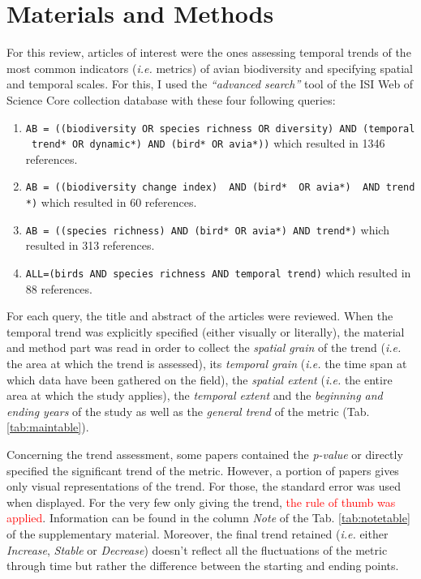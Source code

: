 \documentclass[
  12pt,
  oneside]{report}
\begin{document}
\hypertarget{materials-and-methods}{%
\chapter{Materials and Methods}\label{materials-and-methods}}

For this review, articles of interest were the ones assessing temporal trends of the most common indicators (\emph{i.e.} metrics) of avian biodiversity and specifying spatial and temporal scales. For this, I used the \emph{``advanced search''} tool of the ISI Web of Science Core collection database with these four following queries:

\begin{enumerate}
\def\labelenumi{\arabic{enumi}.}
\item
  \texttt{AB\ =\ ((biodiversity\ OR\ species\ richness\ OR\ diversity)\ AND\ (temporal\ trend*\ OR\ dynamic*)\ AND\ (bird*\ OR\ avia*))} which resulted in 1346 references.
\item
  \texttt{AB\ =\ ((biodiversity\ change\ index)\ \ AND\ (bird*\ \ OR\ avia*)\ \ AND\ trend*)} which resulted in 60 references.
\item
  \texttt{AB\ =\ ((species\ richness)\ AND\ (bird*\ OR\ avia*)\ AND\ trend*)} which resulted in 313 references.
\item
  \texttt{ALL=(birds\ AND\ species\ richness\ AND\ temporal\ trend)} which resulted in 88 references.
\end{enumerate}

For each query, the title and abstract of the articles were reviewed. When the temporal trend was explicitly specified (either visually or literally), the material and method part was read in order to collect the \emph{spatial grain} of the trend (\emph{i.e.} the area at which the trend is assessed), its \emph{temporal grain} (\emph{i.e.} the time span at which data have been gathered on the field), the \emph{spatial extent} (\emph{i.e.} the entire area at which the study applies), the \emph{temporal extent} and the \emph{beginning and ending years} of the study as well as the \emph{general trend} of the metric (Tab. \ref{tab:maintable}).

Concerning the trend assessment, some papers contained the \emph{p-value} or directly specified the significant trend of the metric. However, a portion of papers gives only visual representations of the trend. For those, the standard error was used when displayed. For the very few only giving the trend, \textcolor{red}{the rule of thumb was applied}. Information can be found in the column \emph{Note} of the Tab. \ref{tab:notetable} of the supplementary material. Moreover, the final trend retained (\emph{i.e.} either \emph{Increase}, \emph{Stable} or \emph{Decrease}) doesn't reflect all the fluctuations of the metric through time but rather the difference between the starting and ending points.
\end{document}
